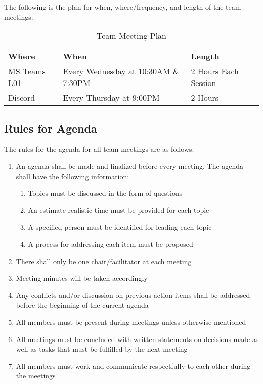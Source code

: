 \documentclass[12pt,letterpaper]{article}
\begin{document}
The following is the plan for when, where/frequency, and length of the team meetings:
\begin{table}[hp]
\begin{tabularx}{\textwidth}{|l|l|X|}
\toprule
\textbf{Where} & \textbf{When} & \textbf{Length}\\
\midrule
MS Teams L01 & Every Wednesday at 10:30AM \& 7:30PM & 2 Hours Each Session\\
Discord & Every Thursday at 9:00PM & 2 Hours\\
\bottomrule
\end{tabularx}
\caption{Team Meeting Plan} \label{tab:teamMeetingPlan}
\end{table}

\subsection{Rules for Agenda}
The rules for the agenda for all team meetings are as follows:
\begin{enumerate}
    \item An agenda shall be made and finalized before every meeting. The agenda shall have the following information: 
    \begin{enumerate}
        \item Topics must be discussed in the form of questions 
        \item An estimate realistic time must be provided for each topic 
        \item A specified person must be identified for leading each topic 
        \item A process for addressing each item must be proposed
    \end{enumerate}
    \item There shall only be one chair/facilitator at each meeting
    \item Meeting minutes will be taken accordingly 
    \item Any conflicts and/or discussion on previous action items shall be addressed before the beginning of the current agenda
    \item All members must be present during meetings unless otherwise mentioned
    \item All meetings must be concluded with written statements on decisions made as well as tasks that must be fulfilled by the next meeting
    \item All members must work and communicate respectfully to each other during the meetings
\end{enumerate}
\end{document}
